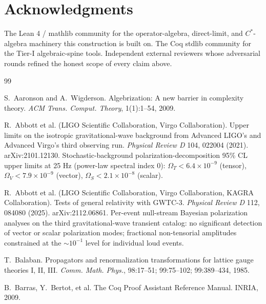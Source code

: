 \documentclass[11pt,a4paper]{amsart}
\theoremstyle{plain}
\theoremstyle{definition}
\begin{document}
\section*{Acknowledgments}

The Lean 4 / mathlib community for the operator-algebra, direct-limit, and $C^*$-algebra machinery this construction is built on. The Coq stdlib community for the Tier-I algebraic-spine tools. Independent external reviewers whose adversarial rounds refined the honest scope of every claim above.

\begin{thebibliography}{99}

S.~Aaronson and A.~Wigderson.
\newblock Algebrization: A new barrier in complexity theory.
\newblock \emph{ACM Trans. Comput. Theory}, 1(1):1--54, 2009.

R.~Abbott et al. (LIGO Scientific Collaboration, Virgo Collaboration).
\newblock Upper limits on the isotropic gravitational-wave background from Advanced LIGO's and Advanced Virgo's third observing run.
\newblock \emph{Physical Review D} 104, 022004 (2021). arXiv:2101.12130. Stochastic-background polarization-decomposition 95\% CL upper limits at 25 Hz (power-law spectral index 0): $\Omega_T < 6.4 \times 10^{-9}$ (tensor), $\Omega_V < 7.9 \times 10^{-9}$ (vector), $\Omega_S < 2.1 \times 10^{-8}$ (scalar).

R.~Abbott et al. (LIGO Scientific Collaboration, Virgo Collaboration, KAGRA Collaboration).
\newblock Tests of general relativity with GWTC-3.
\newblock \emph{Physical Review D} 112, 084080 (2025). arXiv:2112.06861. Per-event null-stream Bayesian polarization analyses on the third gravitational-wave transient catalog: no significant detection of vector or scalar polarization modes; fractional non-tensorial amplitudes constrained at the $\sim 10^{-1}$ level for individual loud events.

T.~Balaban.
\newblock Propagators and renormalization transformations for lattice gauge theories I, II, III.
\newblock \emph{Comm. Math. Phys.}, 98:17--51; 99:75--102; 99:389--434, 1985.

B.~Barras, Y.~Bertot, et al.
\newblock The Coq Proof Assistant Reference Manual.
\newblock INRIA, 2009.


\end{thebibliography}
\end{document}
